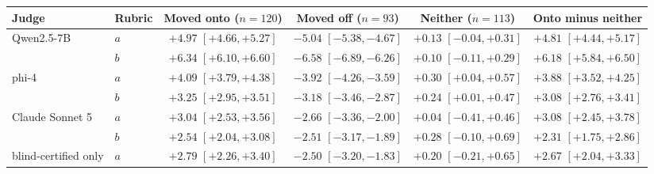 \begin{tabular}{llcccc}
\toprule
Judge & Rubric & Moved onto ($n{=}120$) & Moved off ($n{=}93$) & Neither ($n{=}113$) & Onto minus neither \\
\midrule
Qwen2.5-7B & $a$ & $+4.97$ {\scriptsize$[+4.66,+5.27]$} & $-5.04$ {\scriptsize$[-5.38,-4.67]$} & $+0.13$ {\scriptsize$[-0.04,+0.31]$} & $+4.81$ {\scriptsize$[+4.44,+5.17]$} \\
 & $b$ & $+6.34$ {\scriptsize$[+6.10,+6.60]$} & $-6.58$ {\scriptsize$[-6.89,-6.26]$} & $+0.10$ {\scriptsize$[-0.11,+0.29]$} & $+6.18$ {\scriptsize$[+5.84,+6.50]$} \\
phi-4 & $a$ & $+4.09$ {\scriptsize$[+3.79,+4.38]$} & $-3.92$ {\scriptsize$[-4.26,-3.59]$} & $+0.30$ {\scriptsize$[+0.04,+0.57]$} & $+3.88$ {\scriptsize$[+3.52,+4.25]$} \\
 & $b$ & $+3.25$ {\scriptsize$[+2.95,+3.51]$} & $-3.18$ {\scriptsize$[-3.46,-2.87]$} & $+0.24$ {\scriptsize$[+0.01,+0.47]$} & $+3.08$ {\scriptsize$[+2.76,+3.41]$} \\
Claude Sonnet 5 & $a$ & $+3.04$ {\scriptsize$[+2.53,+3.56]$} & $-2.66$ {\scriptsize$[-3.36,-2.00]$} & $+0.04$ {\scriptsize$[-0.41,+0.46]$} & $+3.08$ {\scriptsize$[+2.45,+3.78]$} \\
 & $b$ & $+2.54$ {\scriptsize$[+2.04,+3.08]$} & $-2.51$ {\scriptsize$[-3.17,-1.89]$} & $+0.28$ {\scriptsize$[-0.10,+0.69]$} & $+2.31$ {\scriptsize$[+1.75,+2.86]$} \\
\quad blind-certified only & $a$ & $+2.79$ {\scriptsize$[+2.26,+3.40]$} & $-2.50$ {\scriptsize$[-3.20,-1.83]$} & $+0.20$ {\scriptsize$[-0.21,+0.65]$} & $+2.67$ {\scriptsize$[+2.04,+3.33]$} \\
\bottomrule
\end{tabular}
